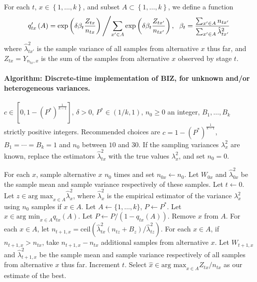 \documentclass{wscpaperproc}
\newcommand{\lambdahat}{\widehat{\lambda}}
\newcommand{\xhat}{\hat{x}}
\newcommand{\upthresh}{P}
\newcommand{\cmax}{1-(P^*)^{\frac1{k-1}}}
\newcommand{\ceil}{\mathrm{ceil}}
\theoremstyle{wsc}
\begin{document}
For each $t$, $x\in\left\{ 1,\ldots,k\right\} $, and subset $A\subset\left\{ 1,\ldots,k\right\} $,
we define a function
\[
q'_{tx}\left(A\right)=\mbox{exp}\left(\delta\beta_{t}\frac{Z_{tx}}{n_{tx}}\right)\left/\sum_{x'\in A}\mbox{exp}\left(\delta\beta_{t}\frac{Z_{tx'}}{n_{tx'}}\right),\right.\mbox{ }\beta_{t}=\frac{\sum_{x'\in A}n_{tx'}}{\sum_{x'\in A}\hat{\lambda}_{tx'}^{2}}
\]
where $\hat{\lambda}_{tx'}^{2}$ is the sample variance of all samples
from alternative $x$ thus far, and $Z_{tx}=Y_{n_{tx},x}$ is the sum of
the samples from alternative $x$ observed by stage $t$.

\paragraph{Algorithm: Discrete-time implementation of BIZ, for unknown and/or heterogeneous variances.}    
\begin{algorithmic}[1]   
\label{alg:hetero-BIZ}   
\REQUIRE $c \in [0,\cmax]$, $\delta>0$, $P^*\in(1/k,1)$, $n_0\ge0$ an integer, $B_1,\ldots,B_k$ strictly positive integers.  Recommended choices are $c=\cmax$, $B_1=\cdots=B_k=1$ and $n_0$ between $10$ and $30$.     If the sampling variances $\lambda^2_x$ are known, replace the estimators     
$\lambdahat^2_{tx}$ with the true values $\lambda^2_x$, and set $n_0=0$.     

\STATE For each $x$, sample alternative $x$ $n_0$ times and set $n_{0x} \leftarrow n_0$.     
Let $W_{0x}$ and $\lambdahat^2_{0x}$ be the sample mean and sample variance respectively of these samples.     Let $t\leftarrow 0$. Let $z \in \mbox{arg max}_{x\in A} \lambdahat^2_{x}$, where $\lambdahat^2_{x}$ is the empirical estimator of the variance $\lambda^2_x$ using $n_0$ samples if $x\in A$.    
\STATE Let $A \leftarrow \{ 1,\ldots, k\}$, $\upthresh \leftarrow P^*$.
 \STATE Let $x\in\mbox{arg min}_{x\in A} q_{tx}\left(A\right)$.
    \STATE Let $\upthresh \leftarrow \upthresh/(1-q_{tx}\left(A\right))$.     
\STATE Remove $x$ from $A$.
\ENDWHILE    
\STATE For each $x\in A$, let      $n_{t+1,x} = \ceil\left( \lambdahat^2_{tx} (n_{tz} + B_z) / \lambdahat^2_{tz} \right)$.     \STATE For each $x\in A$, if $n_{t+1,x}>n_{tx}$, take $n_{t+1,x}-n_{tx}$ additional samples from alternative $x$.  Let $W_{t+1,x}$ and $\lambdahat^2_{t+1,x}$ be the sample mean and sample variance respectively of all samples from alternative $x$ thus far.    
\STATE Increment $t$.
 \ENDWHILE
  \STATE Select $\xhat \in\mbox{arg max}_{x\in A} Z_{tx} / n_{tx}$ as our estimate of the best.

   
\end{algorithmic} 
\hspace{5 mm}
\end{document}
